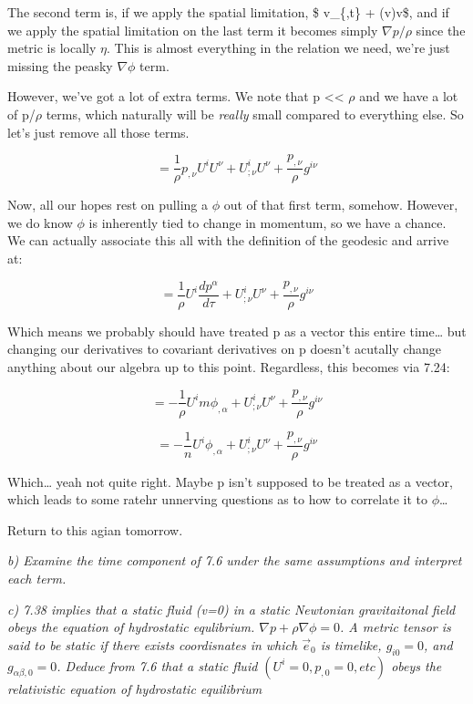 \documentclass[landscape,letterpaper,10pt,english]{article}
\begin{document}
The second term is, if we apply the spatial limitation, \$ v\_\{,t\} +
(v\cdot \nabla)v\$, and if we apply the spatial limitation on the last
term it becomes simply \(\nabla p/\rho\) since the metric is locally
\(\eta\). This is almost everything in the relation we need, we're just
missing the peasky \(\nabla \phi\) term.

However, we've got a lot of extra terms. We note that p
\textless\textless{} \(\rho\) and we have a lot of p/\(\rho\) terms,
which naturally will be \emph{really} small compared to everything else.
So let's just remove all those terms.

\[ = \frac1\rho p_{,\nu}U^i U^\nu + U^i_{;\nu} U^\nu + \frac{p_{,\nu}}{\rho}g^{i\nu}\]

    Now, all our hopes rest on pulling a \(\phi\) out of that first term,
somehow. However, we do know \(\phi\) is inherently tied to change in
momentum, so we have a chance. We can actually associate this all with
the definition of the geodesic and arrive at:

\[ = \frac1\rho U^i \frac{dp^\alpha}{d\tau} + U^i_{;\nu} U^\nu + \frac{p_{,\nu}}{\rho}g^{i\nu}\]

Which means we probably should have treated p as a vector this entire
time\ldots{} but changing our derivatives to covariant derivatives on p
doesn't acutally change anything about our algebra up to this point.
Regardless, this becomes via 7.24:

\[ = - \frac1\rho U^i m \phi_{,\alpha} + U^i_{;\nu} U^\nu + \frac{p_{,\nu}}{\rho}g^{i\nu}\]

\[ = - \frac1n U^i \phi_{,\alpha} + U^i_{;\nu} U^\nu + \frac{p_{,\nu}}{\rho}g^{i\nu}\]

Which\ldots{} yeah not quite right. Maybe p isn't supposed to be treated
as a vector, which leads to some ratehr unnerving questions as to how to
correlate it to \(\phi\)\ldots{}

Return to this agian tomorrow.

    \emph{b) Examine the time component of 7.6 under the same assumptions
and interpret each term.}

    \emph{c) 7.38 implies that a static fluid (v=0) in a static Newtonian
gravitaitonal field obeys the equation of hydrostatic equlibrium.
\(\nabla p + \rho \nabla \phi = 0\). A metric tensor is said to be
static if there exists coordisnates in which \(\vec e_0\) is timelike,
\(g_{i0}=0\), and \(g_{\alpha\beta,0}=0\). Deduce from 7.6 that a static
fluid \((U^i=0, p_{,0}=0, etc)\) obeys the relativistic equation of
hydrostatic equilibrium}
\end{document}
